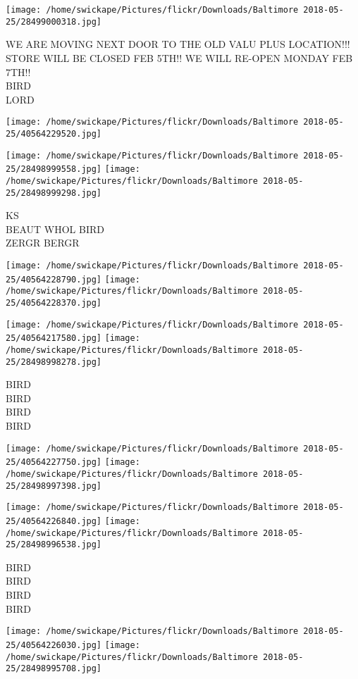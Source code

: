 \documentclass[10pt,letterpaper]{article}
\begin{document}
\texttt{[image: /home/swickape/Pictures/flickr/Downloads/Baltimore 2018-05-25/28499000318.jpg]}

WE ARE MOVING NEXT DOOR TO THE OLD VALU PLUS LOCATION!!! STORE WILL BE CLOSED FEB 5TH!! WE WILL RE{-}OPEN MONDAY FEB 7TH!!\\
BIRD\\
LORD
\pagebreak

\texttt{[image: /home/swickape/Pictures/flickr/Downloads/Baltimore 2018-05-25/40564229520.jpg]}

\vspace{0.25in}
\texttt{[image: /home/swickape/Pictures/flickr/Downloads/Baltimore 2018-05-25/28498999558.jpg]}
\texttt{[image: /home/swickape/Pictures/flickr/Downloads/Baltimore 2018-05-25/28498999298.jpg]}

KS\\
BEAUT WHOL BIRD\\
ZERGR BERGR
\pagebreak

\texttt{[image: /home/swickape/Pictures/flickr/Downloads/Baltimore 2018-05-25/40564228790.jpg]}
\texttt{[image: /home/swickape/Pictures/flickr/Downloads/Baltimore 2018-05-25/40564228370.jpg]}

\texttt{[image: /home/swickape/Pictures/flickr/Downloads/Baltimore 2018-05-25/40564217580.jpg]}
\texttt{[image: /home/swickape/Pictures/flickr/Downloads/Baltimore 2018-05-25/28498998278.jpg]}

BIRD\\
BIRD\\
BIRD\\
BIRD
\pagebreak

\texttt{[image: /home/swickape/Pictures/flickr/Downloads/Baltimore 2018-05-25/40564227750.jpg]}
\texttt{[image: /home/swickape/Pictures/flickr/Downloads/Baltimore 2018-05-25/28498997398.jpg]}

\texttt{[image: /home/swickape/Pictures/flickr/Downloads/Baltimore 2018-05-25/40564226840.jpg]}
\texttt{[image: /home/swickape/Pictures/flickr/Downloads/Baltimore 2018-05-25/28498996538.jpg]}

BIRD\\
BIRD\\
BIRD\\
BIRD
\pagebreak

\texttt{[image: /home/swickape/Pictures/flickr/Downloads/Baltimore 2018-05-25/40564226030.jpg]}
\texttt{[image: /home/swickape/Pictures/flickr/Downloads/Baltimore 2018-05-25/28498995708.jpg]}
\end{document}
